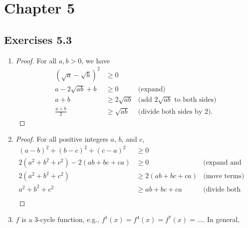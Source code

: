 \documentclass{article}
\begin{document}
\section*{Chapter 5}
\subsection*{Exercises 5.3}

\begin{enumerate}[label=(\roman*)]
    \item \begin{proof}
              For all $a, b > 0$, we have
              \begin{align*}
                  (\sqrt{a} - \sqrt{b})^2 & \ge 0                                   \\
                  a - 2\sqrt{ab} + b      & \ge 0
                                          & \text{(expand)}                         \\
                  a + b                   & \ge 2\sqrt{ab}
                                          & \text{(add $2\sqrt{ab}$ to both sides)} \\
                  \frac{a+b}{2}           & \ge \sqrt{ab}
                                          & \text{(divide both sides by 2).}
              \end{align*}
          \end{proof}
    \item \begin{proof}
              For all positive integers $a$, $b$, and $c$,
              \begin{align*}
                  (a-b)^2 + (b-c)^2 + (c-a)^2          & \ge 0                            \\
                  2(a^2 + b^2 + c^2) - 2(ab + bc + ca) & \ge 0
                                                       & \text{(expand and group terms)}  \\
                  2(a^2 + b^2 + c^2)                   & \ge 2(ab + bc + ca)
                                                       & \text{(move terms)}              \\
                  a^2 + b^2 + c^2                      & \ge ab + bc + ca
                                                       & \text{(divide both sides by 2).} \\
              \end{align*}
          \end{proof}
    \item $f$ is a 3-cycle function, e.g., $f^1(x) = f^4(x) = f^7(x) = \ldots$. In general,

\end{enumerate}
\end{document}
